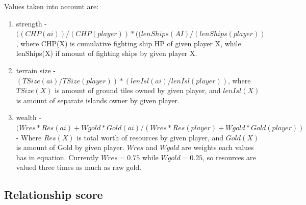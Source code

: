 	Values taken into account are:
	\begin{enumerate}
		\item strength - $( (CHP(ai)) / (CHP(player) ) * ( (lenShips(AI) / (lenShips(player) )$, where CHP(X) is cumulative fighting ship HP of given player X, while lenShips(X) if amount of fighting ships by given player X.
		\item terrain size - $(TSize(ai) / TSize(player)) * (lenIsl(ai) / lenIsl(player))$, where $TSize(X)$ is amount of ground tiles owned by given player, and $lenIsl(X)$ is amount of separate islands owner by given player.
		\item wealth - $(Wres * Res(ai) + Wgold * Gold(ai) / (Wres * Res(player) + Wgold * Gold(player))$ - Where $Res(X)$ is total worth of resources by given player, and $Gold(X)$ is amount of Gold by given player. $Wres$ and $Wgold$ are weights each values has in equation. Currently $Wres = 0.75$ while $Wgold = 0.25$, so resources are valued three times as much as raw gold.
	\end{enumerate}
\subsection{Relationship score}

